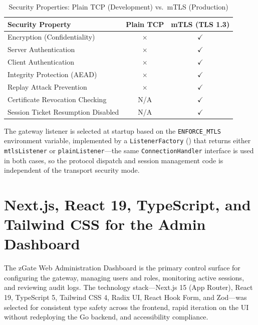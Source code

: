 \begin{table}[H]
\centering
\caption{Security Properties: Plain TCP (Development) vs.\ mTLS (Production)}
\label{tab:tcp-vs-mtls}
\begin{tabular}{|l|c|c|}
\hline
\textbf{Security Property} & \textbf{Plain TCP} & \textbf{mTLS (TLS 1.3)} \\
\hline
Encryption (Confidentiality) & $\times$ & $\checkmark$ \\
Server Authentication & $\times$ & $\checkmark$ \\
Client Authentication & $\times$ & $\checkmark$ \\
Integrity Protection (AEAD) & $\times$ & $\checkmark$ \\
Replay Attack Prevention & $\times$ & $\checkmark$ \\
Certificate Revocation Checking & N/A & $\checkmark$ \\
Session Ticket Resumption Disabled & N/A & $\checkmark$ \\
\hline
\end{tabular}
\end{table}

The gateway listener is selected at startup based on the \texttt{ENFORCE\_MTLS} environment variable, implemented by a \texttt{ListenerFactory} () that returns either \texttt{mtlsListener} or \texttt{plainListener}---the same \texttt{ConnectionHandler} interface is used in both cases, so the protocol dispatch and session management code is independent of the transport security mode.

\section{Next.js, React 19, TypeScript, and Tailwind CSS for the Admin Dashboard}
\label{sec:webui}

The zGate Web Administration Dashboard is the primary control surface for configuring the gateway, managing users and roles, monitoring active sessions, and reviewing audit logs. The technology stack---Next.js 15 (App Router), React 19, TypeScript 5, Tailwind CSS 4, Radix UI, React Hook Form, and Zod---was selected for consistent type safety across the frontend, rapid iteration on the UI without redeploying the Go backend, and accessibility compliance.

